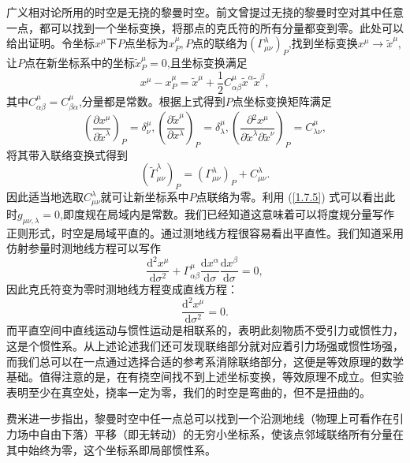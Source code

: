 \documentclass[11pt, a4paper, oneside, onecolumn]{ctexart}
\numberwithin{equation}{subsection}
\begin{document}
广义相对论所用的时空是无挠的黎曼时空。前文曾提过无挠的黎曼时空对其中任意一点，都可以找到一个坐标变换，将那点的克氏符的所有分量都变到零。此处可以给出证明。令坐标$x^{\mu}$下$P$点坐标为$x^{\mu}_{P},P$点的联络为$\left(\Gamma^{\lambda}_{\mu\nu}\right)_{P}$,找到坐标变换$x^{\mu}\to\widetilde{x}^{\mu}$,让$P$点在新坐标系中的坐标$\widetilde{x}^{\mu}_{P}=0$,且坐标变换满足
\begin{equation}
x^{\mu}-x^{\mu}_{P}=\widetilde{x}^{\mu}+\frac{1}{2}C_{\alpha\beta}^{\mu}\widetilde{x}^{\alpha}\widetilde{x}^{\beta},
\end{equation}
其中$C_{\alpha\beta}^{\mu}=C_{\beta\alpha}^{\mu}$,分量都是常数。根据上式得到$P$点坐标变换矩阵满足
\begin{equation}
\left(\frac{\partial{}x^{\mu}}{\partial{}\widetilde{x}^{\lambda}}\right)_{P}=\delta{}^{\mu}_{\nu},\left(\frac{\partial{}\widetilde{x}^{\mu}}{\partial{}x^{\lambda}}\right)_{P}=\delta{}^{\mu}_{\lambda},\left(\frac{\partial{}^{2}x^{\mu}}{\partial{}\widetilde{x}^{\lambda}\partial{}\widetilde{x}^{\nu}}\right)_{P}=C_{\lambda\nu}^{\mu},
\end{equation}
将其带入联络变换式得到
\begin{equation}
\left(\widetilde{\Gamma}^{\lambda}_{\mu\nu}\right)_{P}=\left(\Gamma^{\lambda}_{\mu\nu}\right)_{P}+C_{\mu\nu}^{\lambda}.
\end{equation}
因此适当地选取$C_{\mu\nu}^{\lambda}$就可让新坐标系中$P$点联络为零。利用 (\ref{1.7.5}) 式可以看出此时$g_{\mu\nu,\lambda}=0$,即度规在局域内是常数。我们已经知道这意味着可以将度规分量写作正则形式，时空是局域平直的。通过测地线方程很容易看出平直性。我们知道采用仿射参量时测地线方程可以写作
\begin{equation}
\frac{\mathrm{d}^{2}x^{\mu}}{\mathrm{d}\sigma^{2}}+\Gamma_{\alpha\beta}^{\mu}\frac{\mathrm{d}x^{\alpha}}{\mathrm{d}\sigma}\frac{\mathrm{d}x^{\beta}}{\mathrm{d}\sigma}=0,\tag{1.4.13}
\end{equation}
因此克氏符变为零时测地线方程变成直线方程：
\begin{equation}
\frac{\mathrm{d}^{2}x^{\mu}}{\mathrm{d}\sigma^{2}}=0.
\end{equation}
而平直空间中直线运动与惯性运动是相联系的，表明此刻物质不受引力或惯性力，这是个惯性系。从上述论述我们还可发现联络部分就对应着引力场强或惯性场强，而我们总可以在一点通过选择合适的参考系消除联络部分，这便是等效原理的数学基础。值得注意的是，在有挠空间找不到上述坐标变换，等效原理不成立。但实验表明至少在真空处，挠率一定为零，我们的时空是弯曲的，但不是扭曲的。

费米进一步指出，黎曼时空中任一点总可以找到一个沿测地线（物理上可看作在引力场中自由下落）平移（即无转动）的无穷小坐标系，使该点邻域联络所有分量在其中始终为零，这个坐标系即局部惯性系。
\end{document}
